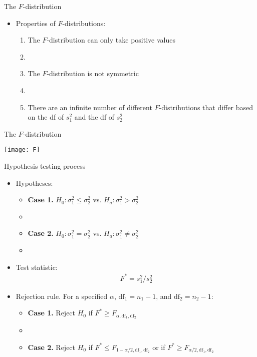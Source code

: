 \documentclass[xcolor=dvipsnames]{beamer}
\begin{document}
\begin{frame}{The $F$-distribution}
	\begin{itemize}
		\item Properties of $F$-distributions:
		\begin{enumerate}
			\item The $F$-distribution can only take positive values
			\item[]
			\item The $F$-distribution is not symmetric
			\item[]
			\item There are an infinite number of different $F$-distributions that differ based on the df of $s_1^2$ and the df of $s_2^2$
			\end{enumerate}
	\end{itemize}
\end{frame}

\begin{frame}{The $F$-distribution}
	\begin{center}
		\texttt{[image: F]}
	\end{center}
\end{frame}

\begin{frame}{Hypothesis testing process}
		\begin{itemize}
		\item Hypotheses:
		\begin{itemize}
			\item \textbf{Case 1.} $H_0: \sigma_1^2 \leq \sigma_2^2$ vs. $H_a: \sigma_1^2 > \sigma_2^2$
			\item[]
			\item \textbf{Case 2.} $H_0: \sigma_1^2 = \sigma_2^2$ vs. $H_a: \sigma_1^2 \neq \sigma_2^2$
			\item[]
		\end{itemize}
		
		\item Test statistic:
		\begin{gather*}
		F^* = s_1^2 /s_2^2
		\end{gather*}
		
		\item Rejection rule. For a specified $\alpha$, $\text{df}_1 = n_1 - 1$, and $\text{df}_2 = n_2-1$:
		\begin{itemize}
			\item \textbf{Case 1.} Reject $H_0$ if $F^* \geq F_{\alpha, \text{df}_1,\text{df}_2}$
			\item[]
			\item \textbf{Case 2.} Reject $H_0$ if $F^* \leq F_{1-\alpha / 2, \text{df}_1,\text{df}_2}$ or if $F^* \geq F_{\alpha / 2, \text{df}_1,\text{df}_2} $
		\end{itemize}
	\end{itemize}
\end{frame}
\end{document}

